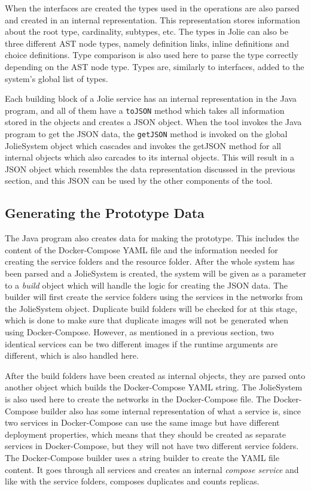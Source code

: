 When the interfaces are created the types used in the operations are also parsed and created in an internal representation.
This representation stores information about the root type, cardinality, subtypes, etc.
The types in Jolie can also be three different AST node types, namely definition links, inline definitions and choice definitions. Type comparison is also used here to parse the type correctly depending on the AST node type.
Types are, similarly to interfaces, added to the system's global list of types.

Each building block of a Jolie service has an internal representation in the Java program, and all of them have a \texttt{toJSON} method which takes all information stored in the objects and creates a JSON object.
When the tool invokes the Java program to get the JSON data, the \texttt{getJSON} method is invoked on the global JolieSystem object which cascades and invokes the getJSON method for all internal objects which also carcades to its internal objects.
This will result in a JSON object which resembles the data representation discussed in the previous section, and this JSON can be used by the other components of the tool.

\subsection{Generating the Prototype Data}
The Java program also creates data for making the prototype. This includes the content of the Docker-Compose YAML file and the information needed for creating the service folders and the resource folder.
After the whole system has been parsed and a JolieSystem is created, the system will be given as a parameter to a \textit{build} object which will handle the logic for creating the JSON data.
The builder will first create the service folders using the services in the networks from the JolieSystem object. Duplicate build folders will be checked for at this stage, which is done to make sure that duplicate images will not be generated when using Docker-Compose.
However, as mentioned in a previous section, two identical services can be two different images if the runtime arguments are different, which is also handled here.

After the build folders have been created as internal objects, they are parsed onto another object which builds the Docker-Compose YAML string. The JolieSystem is also used here to create the networks in the Docker-Compose file.
The Docker-Compose builder also has some internal representation of what a service is, since two services in Docker-Compose can use the same image but have different deployment properties, which means that they should be created as separate services in Docker-Compose, but they will not have two different service folders.
The Docker-Compose builder uses a string builder to create the YAML file content. It goes through all services and creates an internal \textit{compose service} and like with the service folders, composes duplicates and counts replicas.

